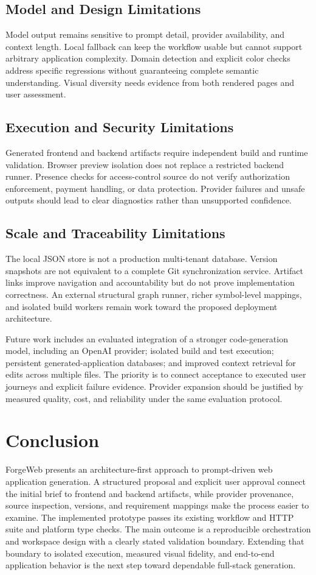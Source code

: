 \documentclass[conference,a4paper]{IEEEtran}
\begin{document}
\subsection{Model and Design Limitations}
Model output remains sensitive to prompt detail, provider availability, and context length. Local fallback can keep the workflow usable but cannot support arbitrary application complexity. Domain detection and explicit color checks address specific regressions without guaranteeing complete semantic understanding. Visual diversity needs evidence from both rendered pages and user assessment.

\subsection{Execution and Security Limitations}
Generated frontend and backend artifacts require independent build and runtime validation. Browser preview isolation does not replace a restricted backend runner. Presence checks for access-control source do not verify authorization enforcement, payment handling, or data protection. Provider failures and unsafe outputs should lead to clear diagnostics rather than unsupported confidence.

\subsection{Scale and Traceability Limitations}
The local JSON store is not a production multi-tenant database. Version snapshots are not equivalent to a complete Git synchronization service. Artifact links improve navigation and accountability but do not prove implementation correctness. An external structural graph runner, richer symbol-level mappings, and isolated build workers remain work toward the proposed deployment architecture.

Future work includes an evaluated integration of a stronger code-generation model, including an OpenAI provider; isolated build and test execution; persistent generated-application databases; and improved context retrieval for edits across multiple files. The priority is to connect acceptance to executed user journeys and explicit failure evidence. Provider expansion should be justified by measured quality, cost, and reliability under the same evaluation protocol.

\section{Conclusion}
ForgeWeb presents an architecture-first approach to prompt-driven web application generation. A structured proposal and explicit user approval connect the initial brief to frontend and backend artifacts, while provider provenance, source inspection, versions, and requirement mappings make the process easier to examine. The implemented prototype passes its existing workflow and HTTP suite and platform type checks. The main outcome is a reproducible orchestration and workspace design with a clearly stated validation boundary. Extending that boundary to isolated execution, measured visual fidelity, and end-to-end application behavior is the next step toward dependable full-stack generation.

\balance


\end{document}
